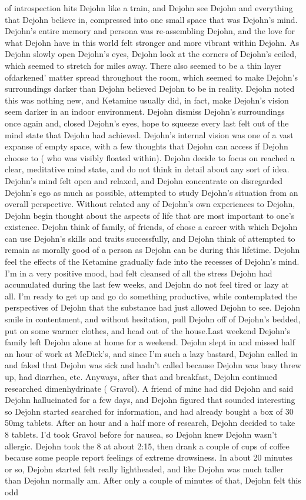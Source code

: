\documentclass[12pt]{book}
\begin{document}
of introspection hits Dejohn like a train, and Dejohn see Dejohn and everything that Dejohn believe in, compressed into one small space that was Dejohn's mind. Dejohn's entire memory and persona was re-assembling Dejohn, and the love for what Dejohn have in this world felt stronger and more vibrant within Dejohn. As Dejohn slowly open Dejohn's eyes, Dejohn look at the corners of Dejohn's ceiled, which seemed to stretch for miles away. There also seemed to be a thin layer ofdarkened' matter spread throughout the room, which seemed to make Dejohn's surroundings darker than Dejohn believed Dejohn to be in reality. Dejohn noted this was nothing new, and Ketamine usually did, in fact, make Dejohn's vision seem darker in an indoor environment. Dejohn dismiss Dejohn's surroundings once again and, closed Dejohn's eyes, hope to squeeze every last felt out of the mind state that Dejohn had achieved. Dejohn's internal vision was one of a vast expanse of empty space, with a few thoughts that Dejohn can access if Dejohn choose to ( who was visibly floated within). Dejohn decide to focus on reached a clear, meditative mind state, and do not think in detail about any sort of idea. Dejohn's mind felt open and relaxed, and Dejohn concentrate on disregarded Dejohn's ego as much as possible, attempted to study Dejohn's situation from an overall perspective. Without related any of Dejohn's own experiences to Dejohn, Dejohn begin thought about the aspects of life that are most important to one's existence. Dejohn think of family, of friends, of chose a career with which Dejohn can use Dejohn's skills and traits successfully, and Dejohn think of attempted to remain as morally good of a person as Dejohn can be during this lifetime. Dejohn feel the effects of the Ketamine gradually fade into the recesses of Dejohn's mind. I'm in a very positive mood, had felt cleansed of all the stress Dejohn had accumulated during the last few weeks, and Dejohn do not feel tired or lazy at all. I'm ready to get up and go do something productive, while contemplated the perspectives of Dejohn that the substance had just allowed Dejohn to see. Dejohn smile in contentment, and without hesitation, pull Dejohn off of Dejohn's bedded, put on some warmer clothes, and head out of the house.Last weekend Dejohn's family left Dejohn alone at home for a weekend. Dejohn slept in and missed half an hour of work at McDick's, and since I'm such a lazy bastard, Dejohn called in and faked that Dejohn was sick and hadn't called because Dejohn was busy threw up, had diarrhea, etc. Anyways, after that and breakfast, Dejohn continued researched dimenhydrinate ( Gravol). A friend of mine had did Dejohn and said Dejohn hallucinated for a few days, and Dejohn figured that sounded interesting so Dejohn started searched for information, and had already bought a box of 30 50mg tablets. After an hour and a half more of research, Dejohn decided to take 8 tablets. I'd took Gravol before for nausea, so Dejohn knew Dejohn wasn't allergic. Dejohn took the 8 at about 2:15, then drank a couple of cups of coffee because some people report feelings of extreme drowsiness. In about 20 minutes or so, Dejohn started felt really lightheaded, and like Dejohn was much taller than Dejohn normally am. After only a couple of minutes of that, Dejohn felt this odd 
\end{document}
